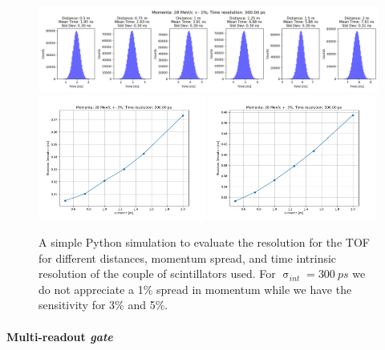 \begin{refsection}
        \begin{figure}
            \centering
            \includegraphics[width=\textwidth]{Figures/muEDM_Dec2023/histo_28_1_300.png}\\
            \includegraphics[width=0.49\textwidth]{Figures/muEDM_Dec2023/trend_28_3_300.00.png}
            \hfill
            \includegraphics[width=0.49\textwidth]{Figures/muEDM_Dec2023/trend_28_5_300.00.png}
            \caption[muEDM 2023: TOF momentum spread.]{A simple Python simulation to evaluate the resolution for the TOF for different distances, momentum spread, and time intrinsic resolution of the couple of scintillators used. For $\upsigma_{int}=\SI{300}{ps}$ we do not appreciate a 1\% spread in momentum while we have the sensitivity for 3\% and 5\%.}
            \label{fig:muEDM:bt2023:TOFPython}
        \end{figure}

        \paragraph{Multi-readout \textit{gate}}
        

\end{refsection}
